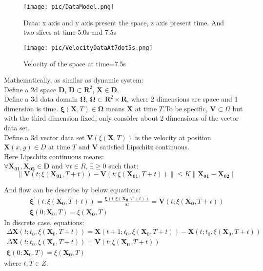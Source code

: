 \documentclass[
     11pt,         %
     a4paper,      %
     oneside,
     ]{article}
\newcommand{\vect}[1]{\boldsymbol{#1}}
\begin{document}
	\begin{figure}[H]
		\begin{minipage}{0.5\textwidth}
			\centering
			\texttt{[image: pic/DataModel.png]}
			\caption{\tiny Data: x axis and y axis present the space, z axis present time. And two slices at time 5.0s and 7.5s}
			\label{fig:DataModel}
		\end{minipage}
		\begin{minipage}{0.5\textwidth}
			\centering
			\texttt{[image: pic/VelocityDataAt7dot5s.png]}
			\caption{\tiny Velocity of the space at time=7.5s}
			\label{fig:VelocityDataAt7.5s}
		\end{minipage}
	\end{figure}	
	Mathematically, as similar as dynamic system:\\
	Define a 2d space $\vect{D}$,  $\vect{D}\subset \vect{R}^{2}$, $\vect{X}\in \vect{D}$.\\
	Define a 3d data domain $\vect{\Omega}$, $\vect{\Omega} \subset \vect{R}^{2}\times\vect{R}$, where 2 dimensions are space and 1 dimension is time. $\vect{\xi}(\vect{X},T) \in \vect{\Omega}$ means $\vect{X}$ at time $T$.To be specific, $\vect{V}\subset \Omega$ but with the third dimension fixed, only consider about 2 dimensions of the vector data set.\\
	Define a 3d vector data set $\vect{V}(\xi(\vect{X},T))$ is the velocity at position $\vect{X}(x,y) \in D$ at time $T$ and $\vect{V}$ satisfied Lipschitz continuous.\\
	Here Lipschitz continuous means:\\
	$\forall\vect{X_{01}}, \vect{X_{02}}\in \vect{D}$ and $\forall t\in R$, $\exists\geq0$ such that:\\
	$$\lVert \vect{V}(t;\xi(\vect{X_{01}},T+t))-\vect{V}(t;\xi(\vect{X_{01}},T+t))\rVert\leq K\lVert\vect{X_{01}}-\vect{X_{02}}\rVert$$

	And flow can be describe by below equations:\\
	\begin{eqnarray}
	\vect{\xi}^{'}(t;\xi(\vect{X_{0}},T+t))=\frac{\vect{\xi}(t;\xi(\vect{X_{0}},T+t))}{dt}=\vect{V}(t;\xi(\vect{X_{0}},T+t))\\
	\vect{\xi}(0;\vect{X}_{0},T)=\xi(\vect{X_{0}},T)
	\end{eqnarray}
	In discrete case, equations:
	\begin{eqnarray}
	\Delta\vect{X}(t;t_{0},\xi(\vect{X}_{0},T+t))=\vect{X}(t+1;t_{0},\xi(\vect{X}_{0},T+t))-\vect{X}(t;t_{0},\xi(\vect{X}_{0},T+t))\\
	\Delta\vect{X}(t;t_{0},\xi(\vect{X}_{0},T+t))=\vect{V}(t;\xi(\vect{X_{0}},T+t))\\
	\vect{\xi}(0;\vect{X}_{0},T)=\xi(\vect{X_{0}},T)
	\end{eqnarray}
	where $t, T\in Z$. 
\end{document}
